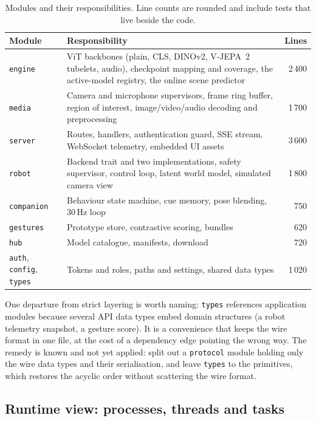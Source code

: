 \documentclass[11pt,onecolumn]{article}
\newcommand{\code}[1]{\texttt{#1}}
\begin{document}
\begin{table}[t]
\centering
\small
\begin{tabular}{@{}>{\raggedright\arraybackslash}p{}>{\raggedright\arraybackslash}p{}r@{}}
\toprule
Module & Responsibility & Lines \\
\midrule
\code{engine} & ViT backbones (plain, CLS, DINOv2, V-JEPA~2 tubelets, audio), checkpoint mapping and coverage, the active-model registry, the online scene predictor & 2\,400 \\
\code{media} & Camera and microphone supervisors, frame ring buffer, region of interest, image/video/audio decoding and preprocessing & 1\,700 \\
\code{server} & Routes, handlers, authentication guard, SSE stream, WebSocket telemetry, embedded UI assets & 3\,600 \\
\code{robot} & Backend trait and two implementations, safety supervisor, control loop, latent world model, simulated camera view & 1\,800 \\
\code{companion} & Behaviour state machine, cue memory, pose blending, 30\,Hz loop & 750 \\
\code{gestures} & Prototype store, contrastive scoring, bundles & 620 \\
\code{hub} & Model catalogue, manifests, download & 720 \\
\code{auth}, \code{config}, \code{types} & Tokens and roles, paths and settings, shared data types & 1\,020 \\
\bottomrule
\end{tabular}
\caption{Modules and their responsibilities. Line counts are rounded and include tests
that live beside the code.}
\label{tab:modules}
\end{table}

One departure from strict layering is worth naming: \code{types} references application
modules because several API data types embed domain structures (a robot telemetry
snapshot, a gesture score). It is a convenience that keeps the wire format in one file,
at the cost of a dependency edge pointing the wrong way. The remedy is known and not yet
applied: split out a \code{protocol} module holding only the wire data types and their
serialisation, and leave \code{types} to the primitives, which restores the acyclic order
without scattering the wire format.

\subsection{Runtime view: processes, threads and tasks}
\label{sec:runtime}
\end{document}
